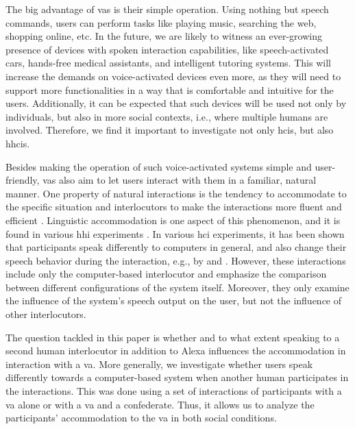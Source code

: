 The big advantage of \acp{va} is their simple operation.
Using nothing but speech commands, users can perform tasks like playing music, searching the web, shopping online, etc.
In the future, we are likely to witness an ever-growing presence of devices with spoken interaction capabilities, like speech-activated cars, hands-free medical assistants, and intelligent tutoring systems.
This will increase the demands on voice-activated devices even more, as they will need to support more functionalities in a way that is comfortable and intuitive for the users.
Additionally, it can be expected that such devices will be used not only by individuals, but also in more social contexts, i.e., where multiple humans are involved.
Therefore, we find it important to investigate not only \aclp{hci}, but also \acp{hhci}.

Besides making the operation of such voice-activated systems simple and user-friendly, \acp{va} also aim to let users interact with them in a familiar, natural manner.
One property of natural interactions is the tendency to accommodate to the specific situation and interlocutors to  make the interactions more fluent and efficient \citep{Giles1991CAT,Gallois2015CAT}.
Linguistic accommodation is one aspect of this phenomenon, and it is found in various \ac{hhi} experiments \citep[e.g.,][]{Pardo2017phonetic,Schweitzer2017social}.
In various \ac{hci} experiments, it has been shown that participants speak differently to computers in general, and also change their speech behavior during the interaction, e.g., by \citet{Branigan2010linguistic} and \citet{Levitan2016implementing}.
However, these interactions include only the computer-based interlocutor and emphasize the comparison between different configurations of the system itself.
Moreover, they only examine the influence of the system's speech output on the user, but not the influence of other interlocutors.

The question tackled in this paper is whether and to what extent speaking to a second human interlocutor in addition to Alexa influences the accommodation in interaction with a \ac{va}.
More generally, we investigate whether users speak differently towards a computer-based system when another human participates in the interactions.
This was done using a set of interactions of participants with a \ac{va} alone or with a \ac{va} and a confederate.
Thus, it allows us to analyze the participants' accommodation to the \ac{va} in both social conditions.

